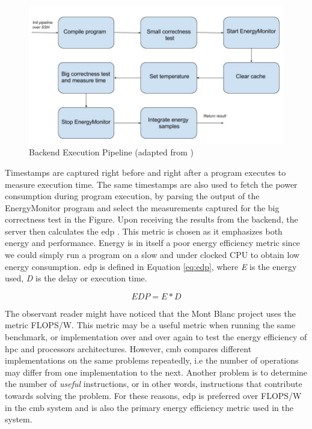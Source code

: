\begin{figure}
  \includegraphics[width=1.0\textwidth]{figs/execution_pipeline.jpg}
  \caption[Backend Execution Pipeline]{Backend Execution Pipeline (adapted from \cite{mt:T&S})}
  \label{fig:execution-pipeline}
\end{figure}

Timestamps are captured right before and right after a program executes to measure execution time. The same timestamps are also used to fetch the power consumption during program execution, by parsing the output of the EnergyMonitor program and select the measurements captured for the big correctness test in the Figure. Upon receiving the results from the backend, the server then calculates the \gls{edp} \cite{a:edp}. This metric is chosen as it emphasizes both energy and performance. Energy is in itself a poor energy efficiency metric since we could simply run a program on a slow and under clocked CPU to obtain low energy consumption. \gls{edp} is defined in Equation \ref{eq:edp}, where \textit{E} is the energy used, \textit{D} is the delay or execution time.

\begin{equation}
  \label{eq:edp}
  EDP = E * D
\end{equation}

The observant reader might have noticed that the Mont Blanc project uses the metric FLOPS/W. This metric may be a useful metric when running the same benchmark, or implementation over and over again to test the energy efficiency of \gls{hpc} and processors architectures. However, \gls{cmb} compares different implementations on the same problems repeatedly, i.e the number of operations may differ from one implementation to the next. Another problem is to determine the number of \textit{useful} instructions, or in other words, instructions that contribute towards solving the problem. For these reasons, \gls{edp} is preferred over FLOPS/W in the \gls{cmb} system and is also the primary energy efficiency metric used in the system.

